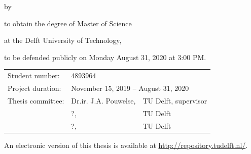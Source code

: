 \begin{titlepage}


\begin{center}


{\makeatletter
\fontsize{64}{64}\selectfont\@title\par
\makeatother}

\bigskip

{\makeatletter
\ifx\@subtitle\undefined\else
    \bigskip
   {\fontsize{32}{42}\selectfont\@subtitle\par}
\fi
\makeatother}

\bigskip
\bigskip

by

\bigskip
\bigskip

{\makeatletter
\fontsize{26}{26}\selectfont\@author
\makeatother}

\bigskip
\bigskip

to obtain the degree of Master of Science

at the Delft University of Technology,

to be defended publicly on Monday August 31, 2020 at 3:00 PM.

\vfill

\begin{tabular}{lll}
    Student number: & 4893964 \\
    Project duration: & \multicolumn{2}{l}{November 15, 2019 -- August 31, 2020} \\
    Thesis committee: & Dr.ir. J.A. Pouwelse, & TU Delft, supervisor \\
        & ?, & TU Delft \\
        & ?, & TU Delft
\end{tabular}

\bigskip
\bigskip

\bigskip
\bigskip
An electronic version of this thesis is available at \url{http://repository.tudelft.nl/}.


\end{center}
\end{titlepage}

